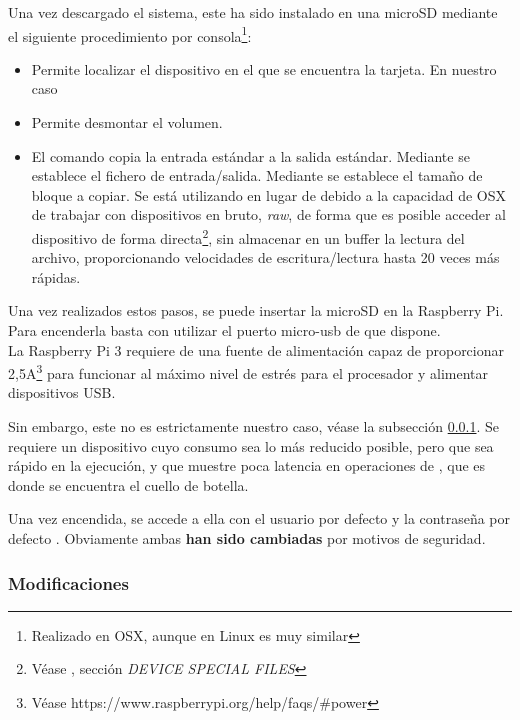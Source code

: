 Una vez descargado el sistema, este ha sido instalado en una microSD mediante el siguiente procedimiento por consola\footnote{Realizado en OSX, aunque en Linux es muy similar}:
\begin{itemize}
\item{} Permite localizar el dispositivo en el que se encuentra la tarjeta. En nuestro caso 
\item{} Permite desmontar el volumen. 
\item{} El comando  copia la entrada estándar a la salida estándar. Mediante  se establece el fichero de entrada/salida. Mediante  se establece el tamaño de bloque a copiar. Se está utilizando  en lugar de  debido a la capacidad de OSX de trabajar con dispositivos en bruto, \textit{raw}, de forma que es posible acceder al dispositivo de forma directa\footnote{Véase , sección \textit{DEVICE SPECIAL FILES}}, sin almacenar en un buffer la lectura del archivo, proporcionando velocidades de escritura/lectura hasta 20 veces más rápidas.
\end{itemize}


Una vez realizados estos pasos, se puede insertar la microSD en la Raspberry Pi. Para encenderla basta con utilizar el puerto micro-usb de que dispone.\\La Raspberry Pi 3 requiere de una fuente de alimentación capaz de proporcionar 2,5A\footnote{Véase https://www.raspberrypi.org/help/faqs/\#power} para funcionar al máximo nivel de estrés para el procesador y alimentar dispositivos USB.

Sin embargo, este no es estrictamente nuestro caso, véase la subsección \ref{subsubsec:Modificaciones}. Se requiere un dispositivo cuyo consumo sea lo más reducido posible, pero que sea rápido en la ejecución, y que muestre poca latencia en operaciones de , que es donde se encuentra el cuello de botella.

Una vez encendida, se accede a ella con el usuario por defecto  y la contraseña por defecto . Obviamente ambas \textbf{han sido cambiadas} por motivos de seguridad.



\subsubsection{Modificaciones}
\label{subsubsec:Modificaciones}

